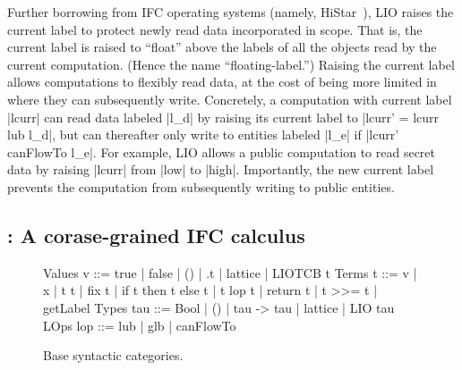 
Further borrowing from IFC operating systems (namely,
HiStar~\cite{zeldovich:histar}), LIO raises the current label to
protect newly read data incorporated in scope.
%
That is, the current label is raised to ``float'' above the labels of
all the objects read by the current computation.
(Hence the name ``floating-label.'')
% 
Raising the current label allows computations to flexibly read data,
at the cost of being more limited in where they can subsequently
write.
%
Concretely, a computation with current label |lcurr| can read data
labeled |l_d| by raising its current label to |lcurr' = lcurr lub
l_d|, but can thereafter only write to entities labeled |l_e| if
|lcurr' canFlowTo l_e|.
%
For example, LIO allows a public computation to read secret data by
raising |lcurr| from |low| to |high|. Importantly, the new current label
prevents the computation from subsequently writing to public entities.


\subsection{\lio: A corase-grained IFC calculus}
 

\begin{figure}[t]
\small
\centering
\begin{code}
Values  v    ::=  true | false | () | \x.t | lattice | LIOTCB t
Terms   t    ::=  v | x | t t | fix t | if t then t else t
               |  t lop t | return t | t >>= t | getLabel
Types   tau  ::=  Bool | () | tau -> tau | lattice | LIO tau  
LOps    lop  ::=  lub | glb | canFlowTo
\end{code}
\caption{\label{fig:sos:base}
          Base \lio{} syntactic categories.}
\end{figure}

